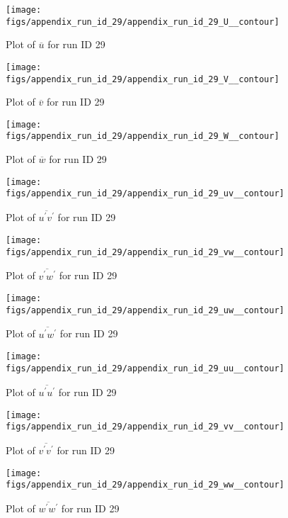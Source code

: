 \begin{figure}[H]
\centering
\texttt{[image: figs/appendix\_run\_id\_29/appendix\_run\_id\_29\_U\_\_contour]}
\caption{Plot of $\overline{u}$ for run ID 29}
\label{fig:appendix_run_id_29_U__contour}
\end{figure}


\begin{figure}[H]
\centering
\texttt{[image: figs/appendix\_run\_id\_29/appendix\_run\_id\_29\_V\_\_contour]}
\caption{Plot of $\overline{v}$ for run ID 29}
\label{fig:appendix_run_id_29_V__contour}
\end{figure}


\begin{figure}[H]
\centering
\texttt{[image: figs/appendix\_run\_id\_29/appendix\_run\_id\_29\_W\_\_contour]}
\caption{Plot of $\overline{w}$ for run ID 29}
\label{fig:appendix_run_id_29_W__contour}
\end{figure}


\begin{figure}[H]
\centering
\texttt{[image: figs/appendix\_run\_id\_29/appendix\_run\_id\_29\_uv\_\_contour]}
\caption{Plot of $\overline{u^\prime v^\prime}$ for run ID 29}
\label{fig:appendix_run_id_29_uv__contour}
\end{figure}


\begin{figure}[H]
\centering
\texttt{[image: figs/appendix\_run\_id\_29/appendix\_run\_id\_29\_vw\_\_contour]}
\caption{Plot of $\overline{v^\prime w^\prime}$ for run ID 29}
\label{fig:appendix_run_id_29_vw__contour}
\end{figure}


\begin{figure}[H]
\centering
\texttt{[image: figs/appendix\_run\_id\_29/appendix\_run\_id\_29\_uw\_\_contour]}
\caption{Plot of $\overline{u^\prime w^\prime}$ for run ID 29}
\label{fig:appendix_run_id_29_uw__contour}
\end{figure}


\begin{figure}[H]
\centering
\texttt{[image: figs/appendix\_run\_id\_29/appendix\_run\_id\_29\_uu\_\_contour]}
\caption{Plot of $\overline{u^\prime u^\prime}$ for run ID 29}
\label{fig:appendix_run_id_29_uu__contour}
\end{figure}


\begin{figure}[H]
\centering
\texttt{[image: figs/appendix\_run\_id\_29/appendix\_run\_id\_29\_vv\_\_contour]}
\caption{Plot of $\overline{v^\prime v^\prime}$ for run ID 29}
\label{fig:appendix_run_id_29_vv__contour}
\end{figure}


\begin{figure}[H]
\centering
\texttt{[image: figs/appendix\_run\_id\_29/appendix\_run\_id\_29\_ww\_\_contour]}
\caption{Plot of $\overline{w^\prime w^\prime}$ for run ID 29}
\label{fig:appendix_run_id_29_ww__contour}
\end{figure}



